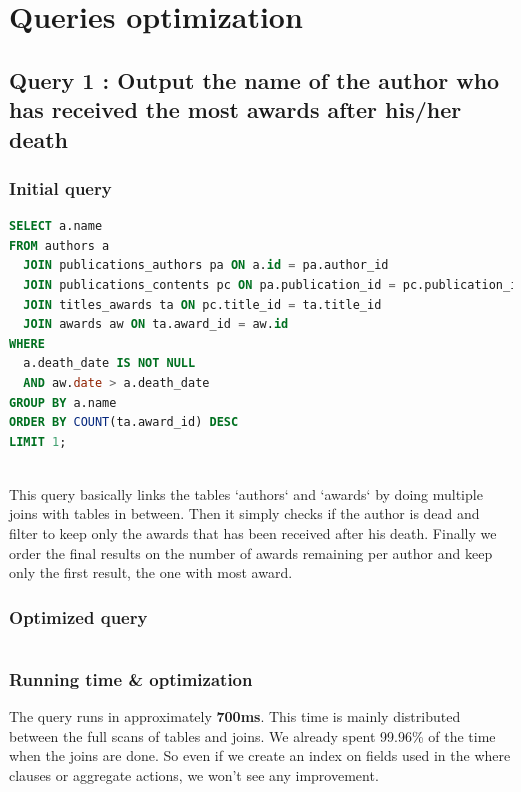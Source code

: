 \documentclass[doubleside, titlepage]{article}
\begin{document}
\newpage

\section{Queries optimization}

\subsection{Query 1 : Output the name of the author who has received the most awards after his/her death}

\subsubsection{Initial query}
		\begin{lstlisting}[language=SQL,showspaces=false,basicstyle=\ttfamily,numberstyle=\tiny,commentstyle=\color{gray}]
SELECT a.name
FROM authors a
  JOIN publications_authors pa ON a.id = pa.author_id
  JOIN publications_contents pc ON pa.publication_id = pc.publication_id
  JOIN titles_awards ta ON pc.title_id = ta.title_id
  JOIN awards aw ON ta.award_id = aw.id
WHERE
  a.death_date IS NOT NULL
  AND aw.date > a.death_date
GROUP BY a.name
ORDER BY COUNT(ta.award_id) DESC
LIMIT 1;
		\end{lstlisting}
~\\	
This query basically links the tables `authors` and `awards` by doing multiple joins with tables in between. Then it simply checks if the author is dead and filter to keep only the awards that has been received after his death. Finally we order the final results on the number of awards remaining per author and keep only the first result, the one with most award.~\\
		
\subsubsection{Optimized query}
		\begin{lstlisting}[language=SQL,showspaces=false,basicstyle=\ttfamily,numberstyle=\tiny,commentstyle=\color{gray}]

		\end{lstlisting}
		
\subsubsection{Running time \& optimization}

The query runs in approximately \textbf{700ms}. This time is mainly distributed between the full scans of tables and joins. We already spent 99.96\% of the time when the joins are done. So even if we create an index on fields used in the where clauses or aggregate actions, we won't see any improvement.
\end{document}
